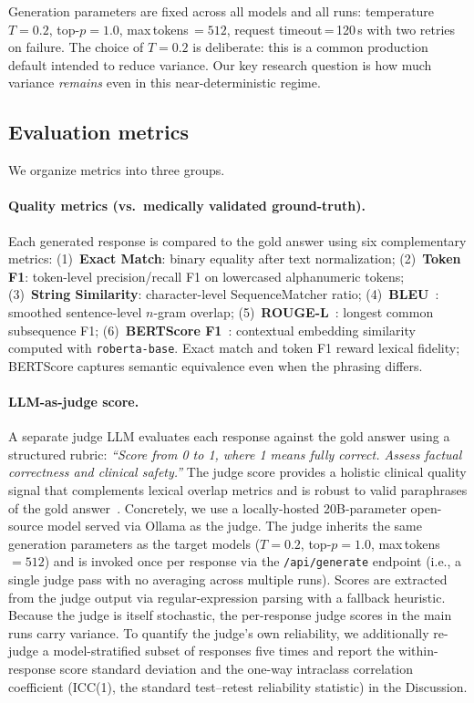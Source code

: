 \documentclass[10pt,letterpaper]{article}
\begin{document}
Generation parameters are fixed across all models and all runs:
temperature $T{=}0.2$, top-$p{=}1.0$, max\,tokens\,$=512$,
request timeout\,=\,120\,s with two retries on failure.
The choice of $T{=}0.2$ is deliberate: this is a common production
default intended to reduce variance.
Our key research question is how much variance \emph{remains} even
in this near-deterministic regime.

\subsection*{Evaluation metrics}
\label{sec:metrics}

We organize metrics into three groups.

\paragraph{Quality metrics (vs.\ medically validated ground-truth).}
Each generated response is compared to the gold answer using six
complementary metrics:
(1)~\textbf{Exact Match}: binary equality after text normalization;
(2)~\textbf{Token F1}: token-level precision/recall F1 on
lowercased alphanumeric tokens;
(3)~\textbf{String Similarity}: character-level SequenceMatcher ratio;
(4)~\textbf{BLEU}~\cite{papineni2002bleu}: smoothed sentence-level
$n$-gram overlap;
(5)~\textbf{ROUGE-L}~\cite{lin2004rouge}: longest common subsequence F1;
(6)~\textbf{BERTScore F1}~\cite{zhang2020bertscore}: contextual
embedding similarity computed with \texttt{roberta-base}.
Exact match and token F1 reward lexical fidelity;
BERTScore captures semantic equivalence even when the phrasing differs.

\paragraph{LLM-as-judge score.}
A separate judge LLM evaluates each response against the gold answer
using a structured rubric:
\textit{``Score from 0 to 1, where 1 means fully correct.
Assess factual correctness and clinical safety.''}
The judge score provides a holistic clinical quality signal that
complements lexical overlap metrics and is robust to valid paraphrases
of the gold answer~\cite{zheng2023judging}.
Concretely, we use a locally-hosted 20B-parameter open-source model
served via Ollama as the judge.
The judge inherits the same generation parameters as the target models
($T{=}0.2$, top-$p{=}1.0$, max\,tokens\,$=512$) and is invoked once
per response via the \texttt{/api/generate} endpoint (i.e., a single
judge pass with no averaging across multiple runs).
Scores are extracted from the judge output via regular-expression
parsing with a fallback heuristic.
Because the judge is itself stochastic, the per-response judge scores in
the main runs carry variance. To quantify the judge's own reliability,
we additionally re-judge a model-stratified subset of responses five
times and report the within-response score standard deviation and the
one-way intraclass correlation coefficient (ICC(1), the standard
test--retest reliability statistic) in the Discussion.
\end{document}
